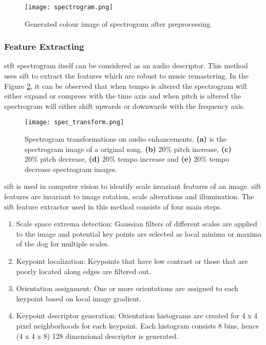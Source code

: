 \begin{figure}[h]
  \centering
  \texttt{[image: spectrogram.png]}
  \caption{Generated colour image of spectrogram after preprocessing.}
  \label{fig:spectrogram}
\end{figure}

\subsubsection{Feature Extracting}

\ac{stft} spectrogram itself can be considered as an audio descriptor\cite{Ke2005}. This method uses \ac{sift}\cite{Lowe2004} to extract 
the features which are robust to music remastering. In the Figure \ref{fig:compare_spectrogram}, it can be observed that when tempo is
altered the spectrogram will either expand or compress with the time axis and when pitch is altered the spectrogram will either shift upwards or 
downwards with the frequency axis. 

\begin{figure}[h]
  \centering
  \texttt{[image: spec\_transform.png]}
  \caption{Spectrogram transformations on audio enhancements. \textbf{(a)} is the spectrogram image of a original song. \textbf{(b)} 20\% 
  pitch increase, \textbf{(c)} 20\% pitch decrease, \textbf{(d)} 20\% tempo increase and \textbf{(e)} 20\% tempo decrease spectrogram images.}
  \label{fig:compare_spectrogram}
\end{figure}

\ac{sift} is used in computer vision to identify scale invariant features of an image. \ac{sift} features are invariant to image rotation,
scale alterations and illumination\cite{Lowe2004}. The \ac{sift} feature extractor used in this method consists of four main steps.
\begin{enumerate}
  \item Scale space extrema detection: Gaussian filters of different scales are applied to the image and potential key points are selected
  as local minima or maxima of the \ac{dog} for multiple scales.
  \item Keypoint localization: Keypoints that have low contrast or those that are poorly located along edges
  are filtered out.
  \item Orientation assignment: One or more orientations are assigned to each keypoint based on local image gradient. 
  \item Keypoint descriptor generation: Orientation histograms are created for 4 x 4 pixel neighborhoods for each keypoint.
  Each histogram consists 8 bins, hence (4 x 4 x 8) 128 dimensional descriptor is generated.
\end{enumerate}

